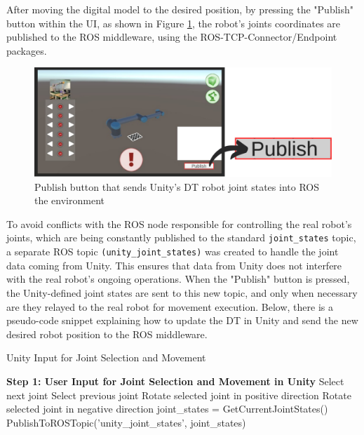 After moving the digital model to the desired position, by pressing the "Publish" button within the \ac{UI}, as shown in Figure \ref{fig:publish_UI_button}, the robot's joints coordinates are published to the \ac{ROS} middleware, using the \ac{ROS}-\ac{TCP}-Connector/Endpoint packages.


\begin{figure}[htpb]
    \centering
    \includegraphics[width=0.8\linewidth]{figs/publish-button.png}
    \caption{Publish button that sends Unity's \ac{DT} robot joint states into ROS the environment}
    \label{fig:publish_UI_button}
\end{figure}

To avoid conflicts with the \ac{ROS} node responsible for controlling the real robot's joints, which are being constantly published to the standard \texttt{joint\_states} topic, a separate \ac{ROS} topic \texttt{(unity\_joint\_states)} was created to handle the joint data coming from Unity. This ensures that data from Unity does not interfere with the real robot’s ongoing operations. When the "Publish" button is pressed, the Unity-defined joint states are sent to this new topic, and only when necessary are they relayed to the real robot for movement execution. Below, there is a pseudo-code snippet explaining how to update the \ac{DT} in Unity and send the new desired robot position to the \ac{ROS} middleware.

\begin{algorithm}
    \caption{Unity Input for Joint Selection and Movement}\label{alg:unity_input}
    \begin{algorithmic}[1]
        \State \textbf{Step 1: User Input for Joint Selection and Movement in Unity}
                \State Select next joint
                \State Select previous joint
            \EndIf
                \State Rotate selected joint in positive direction
                \State Rotate selected joint in negative direction
            \EndIf
                \State joint\_states = GetCurrentJointStates()
                \State PublishToROSTopic('unity\_joint\_states', joint\_states)
            \EndIf
        \EndWhile
    \end{algorithmic}
\end{algorithm}


